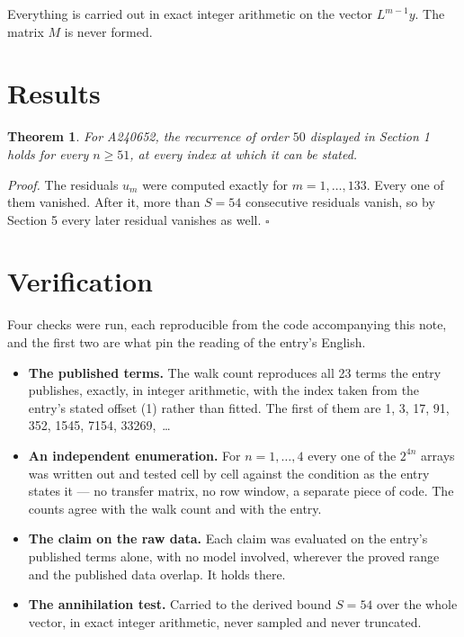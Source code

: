 \documentclass[11pt]{article}
\newtheorem{theorem}{Theorem}
\theoremstyle{definition}
\begin{document}
Everything is carried out in exact integer arithmetic on the vector $L^{m-1}y$. The matrix $M$ is never formed.

\section{Results}

\begin{theorem} For A240652, the recurrence of order $50$ displayed in Section 1 holds for every $n \ge 51$, at every index at which it can be stated.\end{theorem}

{\itshape Proof.} The residuals $u_m$ were computed exactly for $m = 1,\dots,133$. Every one of them vanished. After it, more than $S = 54$ consecutive residuals vanish, so by Section 5 every later residual vanishes as well. $\square$

\section{Verification}

Four checks were run, each reproducible from the code accompanying this note, and the first two are what pin the reading of the entry's English.

\begin{itemize}

\item {\bfseries The published terms.} The walk count reproduces all 23 terms the entry publishes, exactly, in integer arithmetic, with the index taken from the entry's stated offset (1) rather than fitted. The first of them are 1, 3, 17, 91, 352, 1545, 7154, 33269,~\dots

\item {\bfseries An independent enumeration.} For $n = 1,\dots,4$ every one of the $2^{4n}$ arrays was written out and tested cell by cell against the condition as the entry states it --- no transfer matrix, no row window, a separate piece of code. The counts agree with the walk count and with the entry.

\item {\bfseries The claim on the raw data.} Each claim was evaluated on the entry's published terms alone, with no model involved, wherever the proved range and the published data overlap. It holds there.

\item {\bfseries The annihilation test.} Carried to the derived bound $S = 54$ over the whole vector, in exact integer arithmetic, never sampled and never truncated.

\end{itemize}
\end{document}
